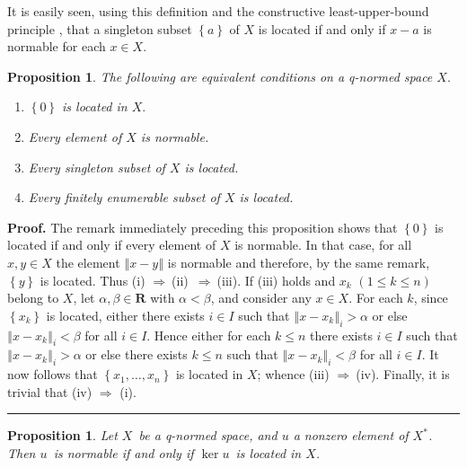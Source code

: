 \documentclass[11pt]{article}%
\newtheorem{proposition}[theorem]{Proposition}
\newenvironment{proof}[1][Proof]{\noindent\textbf{#1.} }{\ \rule{0.5em}{0.5em}}
\begin{document}
%

\noindent
It is easily seen, using this definition and the constructive
least-upper-bound principle \cite[2.1.18]{BVtech}, that a singleton subset
$\left\{  a\right\}  $ of $X$ is located if and only if $x-a$ is normable for
each $x\in X$.

\begin{proposition}
\label{mar03p2}The following are equivalent conditions on a q-normed space
$X.$

\begin{enumerate}
\item[\emph{(i)}] $\left\{  0\right\}  $ is located in $X.$

\item[\emph{(ii)}] Every element of $X$ is normable.

\item[\emph{(iii)}] Every singleton subset of $X$ is located.

\item[\emph{(iv)}] Every finitely enumerable subset of $X$ is located.
\end{enumerate}
\end{proposition}

\begin{proof}
The remark immediately preceding this proposition shows that $\left\{
0\right\}  $ is located if and only if every element of $X$ is normable. In
that case, for all $x,y\in X$ the element $\left\Vert x-y\right\Vert $ is
normable and therefore, by the same remark, $\left\{  y\right\}  $ is located.
Thus (i) $\Rightarrow\ $(ii)\ $\Rightarrow\ $(iii). If (iii) holds and $x_{k}$
$(1\leq k\leq n)$ belong to $X$, let $\alpha,\beta\in\mathbf{R}$ with
$\alpha<\beta$, and consider any $x\in X$. For each $k$, since $\left\{
x_{k}\right\}  $ is located, either there exists $i\in I$ such that
$\left\Vert x-x_{k}\right\Vert _{i}>\alpha$ or else $\left\Vert x-x_{k}%
\right\Vert _{i}<\beta$ for all $i\in I$. Hence either for each $k\leq n$
there exists $i\in I$ such that $\left\Vert x-x_{k}\right\Vert _{i}>\alpha$ or
else there exists $k\leq n$ such that $\left\Vert x-x_{k}\right\Vert
_{i}<\beta$ for all $i\in I$. It now follows that $\left\{  x_{1},\ldots
,x_{n}\right\}  $ is located in $X$; whence (iii) $\Rightarrow~$(iv). Finally,
it is trivial that (iv) $\Rightarrow$ (i).
\end{proof}

\begin{proposition}
\label{feb24p1}Let $X$\ be a q-normed space, and $u$ a nonzero element of
$X^{\ast}$. Then $u$\ is normable if and only if $\ker u$\ is located in $X$.
\end{proposition}
\end{document}
